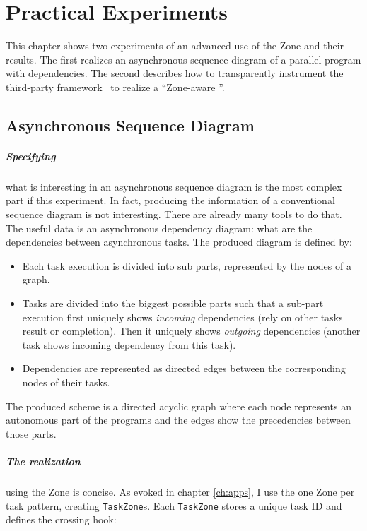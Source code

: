 
\chapter{Practical Experiments}
\label{ch:inpractice}

This chapter shows two experiments of an advanced use of the Zone and their results. The first realizes an asynchronous sequence diagram of a parallel program with dependencies. The second describes how to transparently instrument the third-party framework \vertx\ to realize a ``Zone-aware \vertx''.

\section{Asynchronous Sequence Diagram}


\paragraph{Specifying} what is interesting in an asynchronous sequence diagram is the most complex part if this experiment. In fact, producing the information of a conventional sequence diagram is not interesting. There are already many tools to do that. The useful data is an asynchronous dependency diagram: what are the dependencies between asynchronous tasks. The produced diagram is defined by:

\begin{itemize}
\item Each task execution is divided into sub parts, represented by the nodes of a graph.
\item Tasks are divided into the biggest possible parts such that a sub-part execution first uniquely shows \emph{incoming} dependencies (rely on other tasks result or completion). Then it uniquely shows \emph{outgoing} dependencies (another task shows incoming dependency from this task).
\item Dependencies are represented as directed edges between the corresponding nodes of their tasks.
\end{itemize}

The produced scheme is a directed acyclic graph where each node represents an autonomous part of the programs and the edges show the precedencies between those parts.

\paragraph{The realization} using the Zone is concise. As evoked in chapter \ref{ch:apps}, I use the one Zone per task pattern, creating \lstinline{TaskZone}s. Each \lstinline{TaskZone} stores a unique task ID and defines the crossing hook: 

